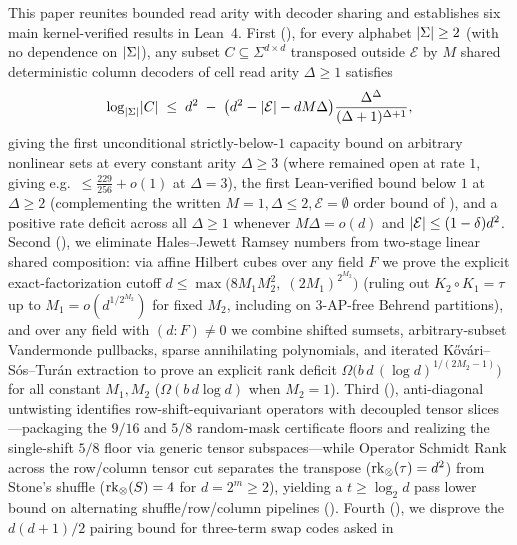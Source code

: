This paper reunites bounded read arity with decoder sharing and establishes six main
kernel-verified results in Lean~4. First (), for every alphabet
$\lvert \Sigma \rvert \ge 2$ (with no dependence on $\lvert \Sigma \rvert$), any subset
$C \subseteq \Sigma^{d\times d}$ transposed outside $\mathcal{E}$ by $M$ shared deterministic
column decoders of cell read arity $\Delta \ge 1$ satisfies
\[
  \log_{\lvert \Sigma \rvert}\lvert C \rvert \;\le\; d^2 \;-\;
  \bigl(d^2 - \lvert \mathcal{E} \rvert - dM\Delta\bigr)\frac{\Delta^\Delta}{(\Delta+1)^{\Delta+1}},
\]
giving the first unconditional strictly-below-$1$ capacity bound on arbitrary nonlinear sets
at every constant arity $\Delta \ge 3$ (where \cite[Problem~9.4(b)]{SeventeenthPaper2026} remained
open at rate $1$, giving e.g.\ $\le \frac{229}{256} + o(1)$ at $\Delta = 3$), the first Lean-verified
bound below $1$ at $\Delta \ge 2$ (complementing the written $M = 1, \Delta \le 2, \mathcal{E}=\emptyset$
order bound of \cite[Proposition~6.22(b)]{SeventeenthPaper2026}), and a positive rate deficit across
all $\Delta \ge 1$ whenever $M\Delta = o(d)$ and $\lvert \mathcal{E} \rvert \le (1-\delta)d^2$. Second (), we eliminate
Hales--Jewett Ramsey numbers from two-stage linear shared composition: via affine Hilbert
cubes over any field $F$ we prove the explicit exact-factorization cutoff
$d \le \max\bigl(8 M_1 M_2^2,\; (2M_1)^{2^{M_2}}\bigr)$ (ruling out $K_2 \circ K_1 = \tau$ up to
$M_1 = o(d^{1/2^{M_2}})$ for fixed $M_2$, including on $3$-AP-free Behrend partitions), and over
any field with $(d : F) \ne 0$ we combine shifted sumsets, arbitrary-subset Vandermonde pullbacks,
sparse annihilating polynomials, and iterated K\H{o}v\'ari--S\'os--Tur\'an extraction to prove an
explicit rank deficit $\Omega\!\bigl(b\,d\,(\log d)^{1/(2M_2-1)}\bigr)$ for all constant $M_1, M_2$
($\Omega(b\,d\log d)$ when $M_2 = 1$). Third (),
anti-diagonal untwisting identifies row-shift-equivariant operators with decoupled tensor
slices---packaging the $9/16$ and $5/8$ random-mask certificate floors and realizing the
single-shift $5/8$ floor via generic tensor subspaces---while Operator Schmidt Rank
across the row/column tensor cut separates the transpose ($\operatorname{rk}_{\otimes}(\tau) = d^2$) from Stone's
shuffle ($\operatorname{rk}_{\otimes}(S) = 4$ for $d = 2^m \ge 2$), yielding a $t \ge \log_2 d$ pass lower bound on alternating
shuffle/row/column pipelines (\cite[Problems~9.1 and~9.5]{SeventeenthPaper2026}). Fourth
(), we disprove the
$d(d+1)/2$ pairing bound for three-term swap codes asked in
